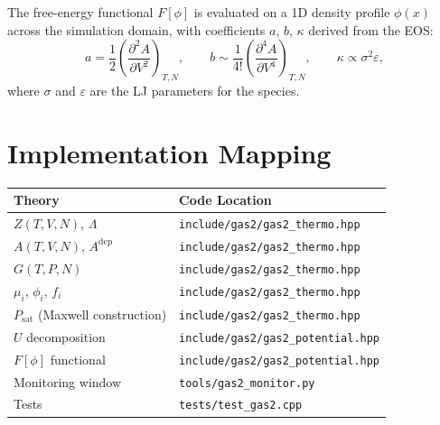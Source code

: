 \documentclass[11pt]{article}
\begin{document}
The free-energy functional $F[\phi]$ is evaluated on a 1D density
profile $\phi(x)$ across the simulation domain, with coefficients
$a$, $b$, $\kappa$ derived from the EOS:
\begin{equation}
  a = \frac{1}{2}\left(\frac{\partial^2 A}{\partial V^2}\right)_{T,N},
  \qquad
  b \sim \frac{1}{4!}\left(\frac{\partial^4 A}{\partial V^4}\right)_{T,N},
  \qquad
  \kappa \propto \sigma^2 \varepsilon,
\end{equation}
where $\sigma$ and $\varepsilon$ are the LJ parameters for the species.


\section{Implementation Mapping}

\begin{center}
\begin{tabular}{ll}
  \toprule
  \textbf{Theory} & \textbf{Code Location} \\
  \midrule
  $Z(T,V,N)$, $\Lambda$
    & \texttt{include/gas2/gas2\_thermo.hpp} \\
  $A(T,V,N)$, $A^\mathrm{dep}$
    & \texttt{include/gas2/gas2\_thermo.hpp} \\
  $G(T,P,N)$
    & \texttt{include/gas2/gas2\_thermo.hpp} \\
  $\mu_i$, $\phi_i$, $f_i$
    & \texttt{include/gas2/gas2\_thermo.hpp} \\
  $P_\mathrm{sat}$ (Maxwell construction)
    & \texttt{include/gas2/gas2\_thermo.hpp} \\
  $U$ decomposition
    & \texttt{include/gas2/gas2\_potential.hpp} \\
  $F[\phi]$ functional
    & \texttt{include/gas2/gas2\_potential.hpp} \\
  Monitoring window
    & \texttt{tools/gas2\_monitor.py} \\
  Tests
    & \texttt{tests/test\_gas2.cpp} \\
  \bottomrule
\end{tabular}
\end{center}
\end{document}
